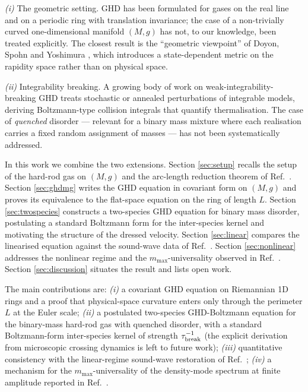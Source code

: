 \documentclass[aps,pre,twocolumn,superscriptaddress,longbibliography,floatfix]{revtex4-2}
\begin{document}
\emph{(i)} The geometric setting. GHD has been formulated for
gases on the real line and on a periodic ring with translation
invariance; the case of a non-trivially curved one-dimensional
manifold $(M,g)$ has not, to our knowledge, been treated
explicitly. The closest result is the ``geometric viewpoint''
of Doyon, Spohn and Yoshimura \cite{DoyonSpohnYoshimura2017},
which introduces a state-dependent metric on the rapidity
space rather than on physical space.

\emph{(ii)} Integrability breaking. A growing body of work on
weak-integrability-breaking GHD \cite{DurninDoyon2021,
WeakBreaking2023, BastianelloBoltzmann2020} treats stochastic
or annealed perturbations of integrable models, deriving
Boltzmann-type collision integrals that quantify
thermalisation. The case of \emph{quenched} disorder ---
relevant for a binary mass mixture where each realisation
carries a fixed random assignment of masses --- has not been
systematically addressed.

In this work we combine the two extensions. Section
\ref{sec:setup} recalls the setup of the hard-rod gas on $(M,g)$
and the arc-length reduction theorem of
Ref.~\cite{PaperI}. Section \ref{sec:ghdmg} writes the GHD
equation in covariant form on $(M,g)$ and proves its equivalence
to the flat-space equation on the ring of length $L$.
Section \ref{sec:twospecies} constructs a two-species GHD
equation for binary mass disorder, postulating a standard
Boltzmann form for the inter-species kernel and motivating
the structure of the dressed velocity. Section \ref{sec:linear} compares the linearised
equation against the sound-wave data of
Ref.~\cite{PaperII}. Section \ref{sec:nonlinear} addresses the
nonlinear regime and the $m_{\max}$-universality observed in
Ref.~\cite{PaperIII}. Section \ref{sec:discussion} situates
the result and lists open work.

The main contributions are:
\emph{(i)} a covariant GHD equation on Riemannian 1D rings
and a proof that physical-space curvature enters only through
the perimeter $L$ at the Euler scale;
\emph{(ii)} a postulated two-species GHD-Boltzmann equation for
the binary-mass hard-rod gas with quenched disorder, with a
standard Boltzmann-form inter-species kernel of strength
$\tau_{\rm break}^{-1}$ (the explicit derivation from
microscopic crossing dynamics is left to future work);
\emph{(iii)} quantitative consistency with the linear-regime
sound-wave restoration of Ref.~\cite{PaperII};
\emph{(iv)} a mechanism for the $m_{\max}$-universality of the
density-mode spectrum at finite amplitude reported in
Ref.~\cite{PaperIII}.
\end{document}
